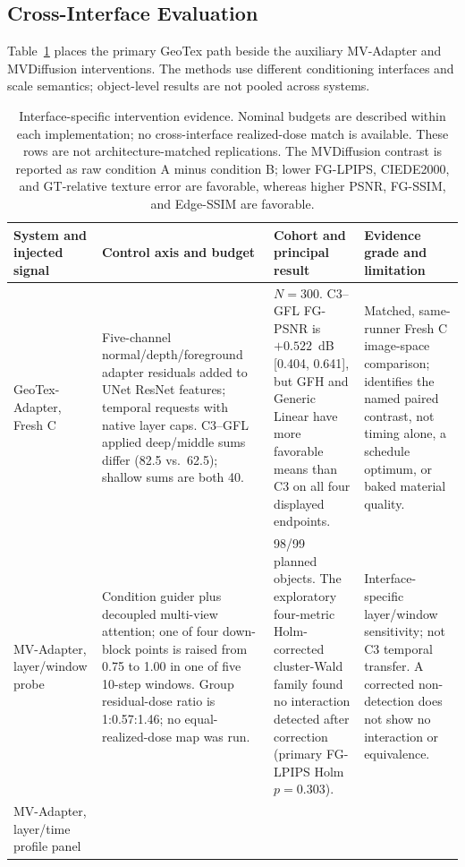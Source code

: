 \documentclass[times,twocolumn,final]{elsarticle}
\begin{document}
\subsection{Cross-Interface Evaluation}
\label{subsec:cross-interface}

Table~\ref{tab:cross-interface} places the primary GeoTex path beside the auxiliary MV-Adapter and MVDiffusion interventions. The methods use different conditioning interfaces and scale semantics; object-level results are not pooled across systems.

\begin{table}[t]
\centering
\scriptsize
\setlength{\tabcolsep}{3pt}
\caption{Interface-specific intervention evidence. Nominal budgets are described within each implementation; no cross-interface realized-dose match is available. These rows are not architecture-matched replications. The MVDiffusion contrast is reported as raw condition A minus condition B; lower FG-LPIPS, CIEDE2000, and GT-relative texture error are favorable, whereas higher PSNR, FG-SSIM, and Edge-SSIM are favorable.}
\label{tab:cross-interface}
\begin{tabular}{p{2.4cm}p{4.0cm}p{4.2cm}p{4.5cm}}
\toprule
System and injected signal & Control axis and budget & Cohort and principal result & Evidence grade and limitation \\
\midrule
GeoTex-Adapter, Fresh C &
Five-channel normal/depth/foreground adapter residuals added to UNet ResNet features; temporal requests with native layer caps. C3--GFL applied deep/middle sums differ (82.5 vs.\ 62.5); shallow sums are both 40. &
$N=300$. C3--GFL FG-PSNR is $+0.522$~dB [0.404, 0.641], but GFH and Generic Linear have more favorable means than C3 on all four displayed endpoints. &
Matched, same-runner Fresh C image-space comparison; identifies the named paired contrast, not timing alone, a schedule optimum, or baked material quality. \\
MV-Adapter, layer/window probe &
Condition guider plus decoupled multi-view attention; one of four down-block points is raised from 0.75 to 1.00 in one of five 10-step windows. Group residual-dose ratio is 1:0.57:1.46; no equal-realized-dose map was run. &
98/99 planned objects. The exploratory four-metric Holm-corrected cluster-Wald family found no interaction detected after correction (primary FG-LPIPS Holm $p=0.303$). &
Interface-specific layer/window sensitivity; not C3 temporal transfer. A corrected non-detection does not show no interaction or equivalence. \\
MV-Adapter, layer/time profile panel &

\end{tabular}
\end{table}
\end{document}
